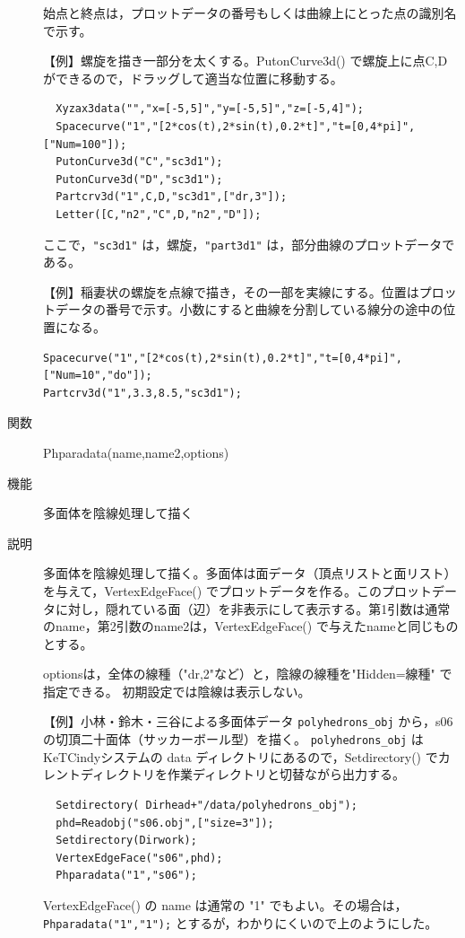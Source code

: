 \documentclass[papersize,a4paper,12pt,uplatex]{jsarticle}
\begin{document}
\begin{description}
始点と終点は，プロットデータの番号もしくは曲線上にとった点の識別名で示す。

\vspace{\baselineskip}
【例】螺旋を描き一部分を太くする。PutonCurve3d() で螺旋上に点C,Dができるので，ドラッグして適当な位置に移動する。
\begin{verbatim}
  Xyzax3data("","x=[-5,5]","y=[-5,5]","z=[-5,4]");
  Spacecurve("1","[2*cos(t),2*sin(t),0.2*t]","t=[0,4*pi]",["Num=100"]);
  PutonCurve3d("C","sc3d1");
  PutonCurve3d("D","sc3d1");
  Partcrv3d("1",C,D,"sc3d1",["dr,3"]);
  Letter([C,"n2","C",D,"n2","D"]);
\end{verbatim}
  ここで，\verb|"sc3d1"| は，螺旋，\verb|"part3d1"| は，部分曲線のプロットデータである。
  
\begin{center}  \end{center}

\vspace{\baselineskip}
【例】稲妻状の螺旋を点線で描き，その一部を実線にする。位置はプロットデータの番号で示す。小数にすると曲線を分割している線分の途中の位置になる。
\begin{verbatim}
Spacecurve("1","[2*cos(t),2*sin(t),0.2*t]","t=[0,4*pi]",["Num=10","do"]);
Partcrv3d("1",3.3,8.5,"sc3d1");
\end{verbatim}
              \begin{center}  \end{center}

\hypertarget{phparadata}{}
\item[関数]  Phparadata(name,name2,options)
\item[機能]  多面体を陰線処理して描く
\item[説明]  多面体を陰線処理して描く。多面体は面データ（頂点リストと面リスト）を与えて，VertexEdgeFace() でプロットデータを作る。このプロットデータに対し，隠れている面（辺）を非表示にして表示する。第1引数は通常のname，第2引数のname2は，VertexEdgeFace() で与えたnameと同じものとする。

  optionsは，全体の線種（"dr,2"など）と，陰線の線種を"Hidden=線種" で指定できる。 初期設定では陰線は表示しない。
  
\vspace{\baselineskip}
【例】小林・鈴木・三谷による多面体データ  \verb|polyhedrons_obj|  から，s06の切頂二十面体（サッカーボール型）を描く。 \verb|polyhedrons_obj| は KeTCindyシステムの data ディレクトリにあるので，Setdirectory() でカレントディレクトリを作業ディレクトリと切替ながら出力する。
\begin{verbatim}
  Setdirectory( Dirhead+"/data/polyhedrons_obj");
  phd=Readobj("s06.obj",["size=3"]);
  Setdirectory(Dirwork);
  VertexEdgeFace("s06",phd);
  Phparadata("1","s06");
\end{verbatim}
  VertexEdgeFace() の name は通常の "1" でもよい。その場合は，\verb|Phparadata("1","1");| とするが，わかりにくいので上のようにした。
  

\end{description}
\end{document}
